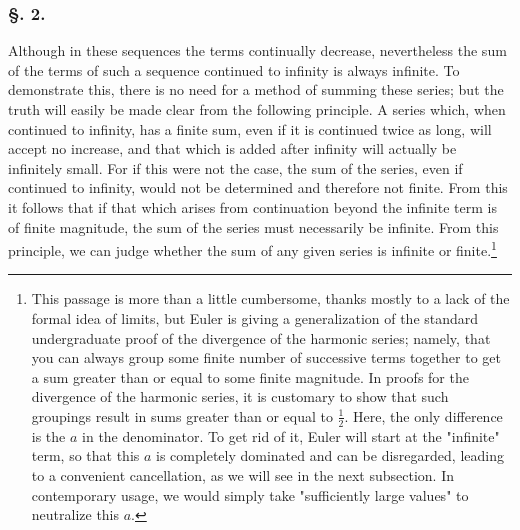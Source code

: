 \documentclass[12pt, letterpaper]{article}
\begin{document}
\subsubsection*{\S. 2.}
Although in these sequences the terms continually decrease, nevertheless the
sum of the terms of such a sequence continued to infinity is always infinite.
To demonstrate this, there is no need for a method of summing these series;
but the truth will easily be made clear from the following principle.
A series which, when continued to infinity, has a finite sum, even if it is
continued twice as long, will accept no increase, and that which is added
after infinity will actually be infinitely small.
For if this were not the case, the sum of the series, even if continued to
infinity, would not be determined and therefore not finite.
From this it follows that if that which arises from continuation beyond the
infinite term is of finite magnitude, the sum of the series must necessarily
be infinite.
From this principle, we can judge whether the sum of any given series is
infinite or finite.\footnote{
    This passage is more than a little cumbersome, thanks mostly to a lack
    of the formal idea of limits, but  Euler is giving a
    generalization of the standard undergraduate proof of the divergence
    of the harmonic series; namely, that you can always group some finite
    number of successive terms together to get a sum greater than or equal
    to some finite magnitude. In proofs for the divergence of the harmonic
    series, it is customary to show that such groupings result in sums
    greater than or equal to $\frac{1}{2}$. Here, the only difference is
    the $a$ in the denominator. To get rid of it, Euler will start at
    the "infinite" term, so that this $a$ is completely dominated and
    can be disregarded, leading to a convenient cancellation, as we will
    see in the next subsection. In contemporary usage, we would simply
    take "sufficiently large values" to neutralize this $a$.
}
\end{document}
